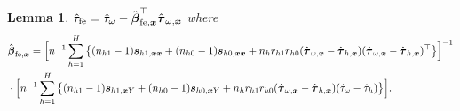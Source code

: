\documentclass[12pt]{article}
\newtheorem{lemma}{Lemma}
\newcommand{\fe}{\textnormal{fe}}
\newcommand{\bs}{\boldsymbol}
\begin{document}
\begin{lemma}
\label{lem:fe-estimator-expression}
$\hat{\tau}_{\fe } = \hat{\tau}_{\omega} -\hat{\bs{\beta}}_{\fe, \bs{x}}^\top \hat{\bs{\tau}}_{\omega,\bs{x}}$ where
    \begin{align*}
        &\hat{\bs{\beta}}_{\fe, \bs{x}} =  \Big[n^{-1}\sum_{h=1}^H \big\{ (n_{h1}-1) \bs{s}_{h1,\bs{x}\bs{x}}+(n_{h0}-1) \bs{s}_{h0,\bs{x}\bs{x}} + n_hr_{h1}r_{h0}(\hat{\bs{\tau}}_{\omega,\bs{x}} - \hat{\bs{\tau}}_{h,\bs{x}})(\hat{\bs{\tau}}_{\omega,\bs{x}} - \hat{\bs{\tau}}_{h,\bs{x}})^\top\big\}\Big]^{-1} \\
       & \cdot\Big[n^{-1}\sum_{h=1}^H \big\{ (n_{h1}-1) \bs{s}_{h1,\bs{x}Y}+(n_{h0}-1) \bs{s}_{h0,\bs{x}Y} + n_hr_{h1}r_{h0}(\hat{\bs{\tau}}_{\omega,\bs{x}} - \hat{\bs{\tau}}_{h,\bs{x}})(\hat{\tau}_{\omega} - \hat{\tau}_{h})\big\}\Big].
    \end{align*}
\end{lemma}
\end{document}
